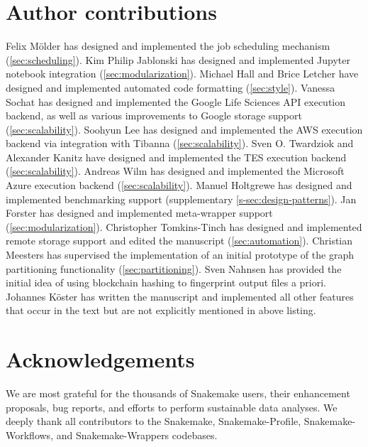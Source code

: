 \documentclass[parskip=half]{scrartcl}
\begin{document}
\section{Author contributions}
Felix Mölder has designed and implemented the job scheduling mechanism (\autoref{sec:scheduling}).
Kim Philip Jablonski has designed and implemented Jupyter notebook integration (\autoref{sec:modularization}).
Michael Hall and Brice Letcher have designed and implemented automated code formatting (\autoref{sec:style}).
Vanessa Sochat has designed and implemented the Google Life Sciences API execution backend, as well as various improvements to Google storage support (\autoref{sec:scalability}).
Soohyun Lee has designed and implemented the AWS execution backend via integration with Tibanna (\autoref{sec:scalability}).
Sven O.
Twardziok and Alexander Kanitz have designed and implemented the TES execution backend (\autoref{sec:scalability}).
Andreas Wilm has designed and implemented the Microsoft Azure execution backend (\autoref{sec:scalability}).
Manuel Holtgrewe has designed and implemented benchmarking support (supplementary \autoref{s-sec:design-patterns}).
Jan Forster has designed and implemented meta-wrapper support (\autoref{sec:modularization}).
Christopher Tomkins-Tinch has designed and implemented remote storage support and edited the manuscript (\autoref{sec:automation}).
Christian Meesters has supervised the implementation of an initial prototype of the graph partitioning functionality (\autoref{sec:partitioning}).
Sven Nahnsen has provided the initial idea of using blockchain hashing to fingerprint output files a priori.
Johannes Köster has written the manuscript and implemented all other features that occur in the text but are not explicitly mentioned in above listing.

\section{Acknowledgements}
We are most grateful for the thousands of Snakemake users, their enhancement proposals, bug reports, and efforts to perform sustainable data analyses.
We deeply thank all contributors to the Snakemake, Snakemake-Profile, Snakemake-Workflows, and Snakemake-Wrappers codebases.

\printbibliography
\end{document}
